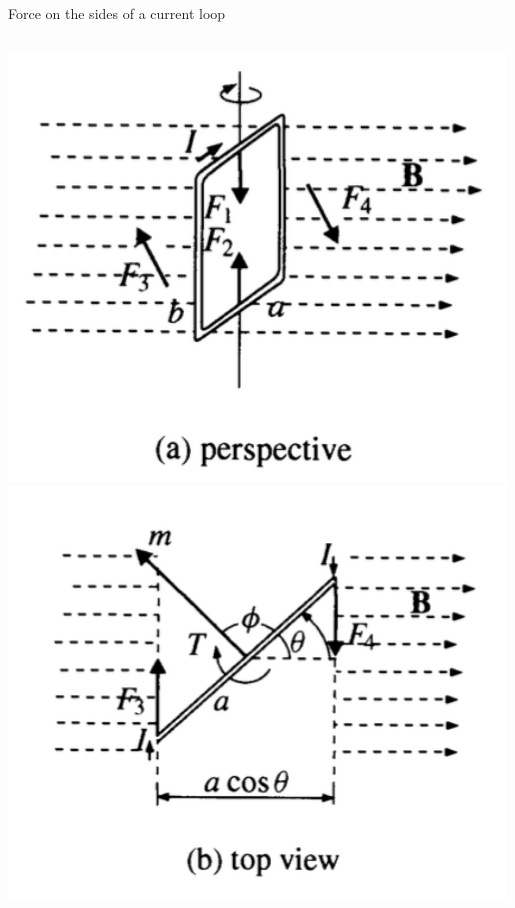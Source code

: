 %
%
%

\begin{frame}{Force on the sides of a current loop}

\begin{columns}
  \begin{column}{0.37\textwidth}
    \includegraphics[width=0.99\textwidth]{./images/schematics/magnetic_torque_current_loop_perspective.png}\\
    \vspace{0.3cm}
    \includegraphics[width=0.99\textwidth]{./images/schematics/magnetic_torque_current_loop_top_view.png}\\

\end{column}
\end{columns}
\end{frame}
